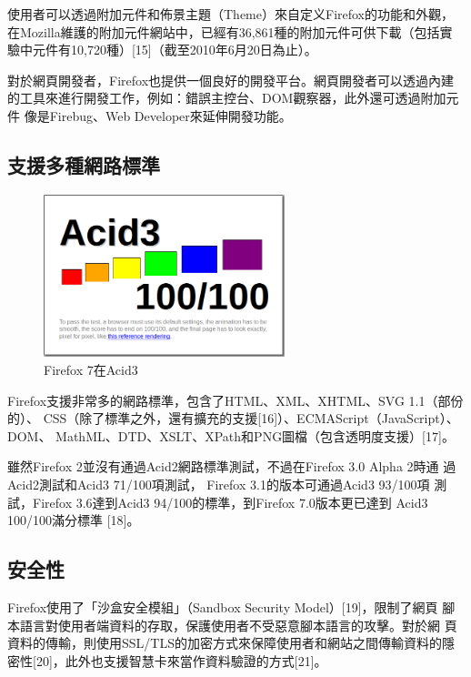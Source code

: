 \documentclass[12pt, a4paper, twoside]{article}
\begin{document}
使用者可以透過附加元件和佈景主題（Theme）來自定义Firefox的功能和外觀，
在Mozilla維護的附加元件網站中，已經有36,861種的附加元件可供下載（包括實
  驗中元件有10,720種）[15]（截至2010年6月20日為止）。

對於網頁開發者，Firefox也提供一個良好的開發平台。網頁開發者可以透過內建
的工具來進行開發工作，例如：錯誤主控台、DOM觀察器，此外還可透過附加元件
像是Firebug、Web Developer來延伸開發功能。

\subsection{支援多種網路標準}

\begin{figure}
\centering
\includegraphics[width=70mm]{Firefox_7_Acid_3_Result}
\caption{Firefox 7在Acid3\protect{}
  \protect\footnotemark}
\end{figure}
\addtocounter{footnote}{-2}

Firefox支援非常多的網路標準，包含了HTML、XML、XHTML、SVG 1.1（部份的）、
CSS（除了標準之外，還有擴充的支援[16]）、ECMAScript（JavaScript）、DOM、
MathML、DTD、XSLT、XPath和PNG圖檔（包含透明度支援）[17]。

雖然Firefox 2並沒有通過Acid2網路標準測試，不過在Firefox 3.0 Alpha 2時通
過Acid2測試和Acid3 71/100項測試， Firefox 3.1的版本可通過Acid3 93/100項
測試，Firefox 3.6達到Acid3 94/100的標準，到Firefox 7.0版本更已達到
Acid3 100/100滿分標準 [18]。

\subsection{安全性}

Firefox使用了「沙盒安全模組」（Sandbox Security Model）[19]，限制了網頁
腳本語言對使用者端資料的存取，保護使用者不受惡意腳本語言的攻擊。對於網
頁資料的傳輸，則使用SSL/TLS的加密方式來保障使用者和網站之間傳輸資料的隱
密性[20]，此外也支援智慧卡來當作資料驗證的方式[21]。
\end{document}
